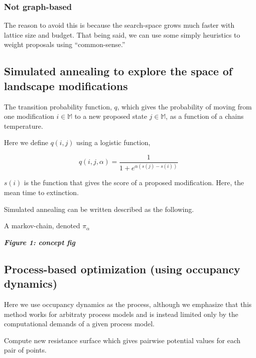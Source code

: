 \documentclass[11pt]{article}
\begin{document}
\hypertarget{not-graph-based}{%
\subsubsection{Not graph-based}\label{not-graph-based}}

The reason to avoid this is because the search-space grows much faster
with lattice size and budget. That being said, we can use some simply
heuristics to weight proposals using ``common-sense.''

\hypertarget{simulated-annealing-to-explore-the-space-of-landscape-modifications}{%
\subsection{Simulated annealing to explore the space of landscape
modifications}\label{simulated-annealing-to-explore-the-space-of-landscape-modifications}}

The transition probability function, \(q\), which gives the probability
of moving from one modification \(i \in \mathbb{M}\) to a new proposed
state \(j \in \mathbb{M}\), as a function of a chains temperature.

Here we define \(q(i,j)\) using a logistic function,

\[q(i,j, \alpha) = \frac{1}{1 + e^{\alpha (s(j) - s(i))}}\]

\(s(i)\) is the function that gives the score of a proposed
modification. Here, the mean time to extinction.

Simulated annealing can be written described as the following.

A markov-chain, denoted \(\pi_\alpha\)

\textbf{\emph{Figure 1: concept fig}}

\hypertarget{process-based-optimization-using-occupancy-dynamics}{%
\subsection{Process-based optimization (using occupancy
dynamics)}\label{process-based-optimization-using-occupancy-dynamics}}

Here we use occupancy dynamics as the process, although we emphasize
that this method works for arbitraty process models and is instead
limited only by the computational demands of a given process model.

Compute new resistance surface which gives pairwise potential values for
each pair of points.
\end{document}
